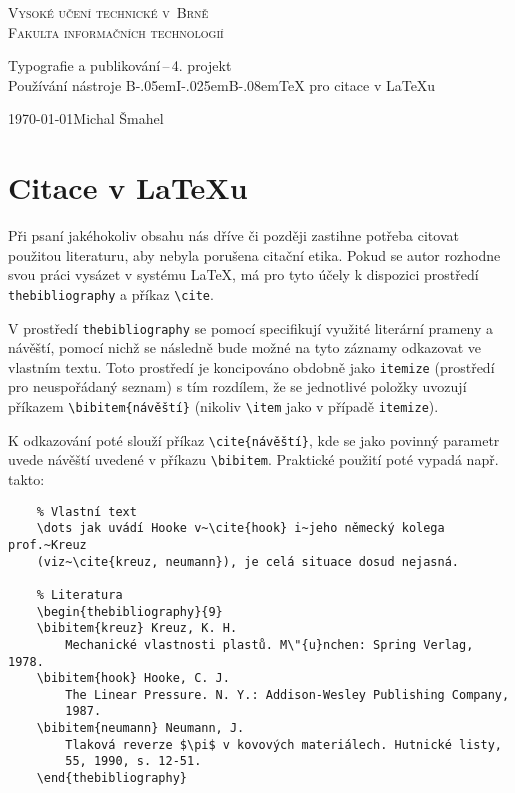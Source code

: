 \documentclass[a4paper, 11pt, final]{article}
\begin{document}
\begin{titlepage}
\begin{center}
    \Huge \textsc{Vysoké učení technické v~Brně}\\
    \huge \textsc{Fakulta informačních technologií}
    
    
    \LARGE Typografie a publikování\,--\,4. projekt\\
    \Huge Používání nástroje B\kern-.05em{\huge I}\kern-.025em{\huge B}\kern-.08em\TeX{} pro citace v \LaTeX{}u
    
\end{center}

\Large \noindent \today \hfill Michal Šmahel
\end{titlepage}

\section{Citace v \LaTeX{}u}
\label{sec:latex-citations}

Při psaní jakéhokoliv obsahu nás dříve či později zastihne potřeba citovat použitou literaturu, aby nebyla porušena
citační etika. Pokud se autor rozhodne svou práci vysázet v systému \LaTeX{}, má pro tyto účely k dispozici prostředí
\texttt{thebibliography} a příkaz \verb|\cite|.

V prostředí \texttt{thebibliography} se pomocí specifikují využité literární prameny a návěští, pomocí nichž se
následně bude možné na tyto záznamy odkazovat ve vlastním textu. Toto prostředí je koncipováno obdobně jako
\texttt{itemize} (prostředí pro neuspořádaný seznam) s tím rozdílem, že se jednotlivé položky uvozují příkazem
\verb|\bibitem{návěští}| (nikoliv \verb|\item| jako v případě \texttt{itemize}).

K odkazování poté slouží příkaz \verb|\cite{návěští}|, kde se jako povinný parametr uvede návěští uvedené v příkazu
\verb|\bibitem|. Praktické použití poté vypadá např. takto:

\begin{verbatim}
    % Vlastní text
    \dots jak uvádí Hooke v~\cite{hook} i~jeho německý kolega prof.~Kreuz
    (viz~\cite{kreuz, neumann}), je celá situace dosud nejasná.
    
    % Literatura
    \begin{thebibliography}{9}
    \bibitem{kreuz} Kreuz, K. H.
        Mechanické vlastnosti plastů. M\"{u}nchen: Spring Verlag, 1978.
    \bibitem{hook} Hooke, C. J.
        The Linear Pressure. N. Y.: Addison-Wesley Publishing Company,
        1987.
    \bibitem{neumann} Neumann, J.
        Tlaková reverze $\pi$ v kovových materiálech. Hutnické listy,
        55, 1990, s. 12-51.
    \end{thebibliography}
\end{verbatim}
\end{document}

